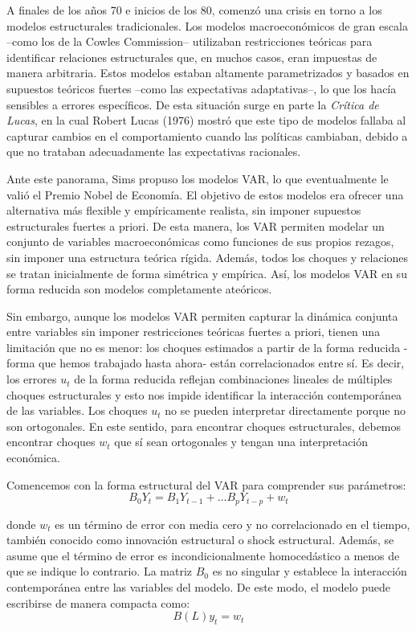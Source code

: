 \documentclass[
]{book}
\begin{document}
A finales de los años 70 e inicios de los 80, comenzó una crisis en
torno a los modelos estructurales tradicionales. Los modelos
macroeconómicos de gran escala --como los de la Cowles Commission--
utilizaban restricciones teóricas para identificar relaciones
estructurales que, en muchos casos, eran impuestas de manera arbitraria.
Estos modelos estaban altamente parametrizados y basados en supuestos
teóricos fuertes --como las expectativas adaptativas--, lo que los hacía
sensibles a errores específicos. De esta situación surge en parte la
\emph{Crítica de Lucas}, en la cual Robert Lucas (1976) mostró que este tipo
de modelos fallaba al capturar cambios en el comportamiento cuando las
políticas cambiaban, debido a que no trataban adecuadamente las
expectativas racionales.

Ante este panorama, Sims propuso los modelos VAR, lo que eventualmente
le valió el Premio Nobel de Economía. El objetivo de estos modelos era
ofrecer una alternativa más flexible y empíricamente realista, sin
imponer supuestos estructurales fuertes a priori. De esta manera, los
VAR permiten modelar un conjunto de variables macroeconómicas como
funciones de sus propios rezagos, sin imponer una estructura teórica
rígida. Además, todos los choques y relaciones se tratan inicialmente de
forma simétrica y empírica. Así, los modelos VAR en su forma reducida
son modelos completamente ateóricos.

Sin embargo, aunque los modelos VAR permiten capturar la dinámica
conjunta entre variables sin imponer restricciones teóricas fuertes a
priori, tienen una limitación que no es menor: los choques estimados a
partir de la forma reducida -forma que hemos trabajado hasta
ahora- están correlacionados entre sí. Es decir, los errores \(u_t\)
de la forma reducida reflejan combinaciones lineales de múltiples
choques estructurales y esto nos impide identificar la interacción contemporánea de las variables. Los choques \(u_t\) no se pueden interpretar directamente porque no son ortogonales. En este sentido, para encontrar choques estructurales, debemos encontrar choques \(w_t\) que sí sean ortogonales y tengan una interpretación económica.

Comencemos con la forma estructural del VAR para comprender sus parámetros:
\begin{equation}
B_0 Y_t = B_1 Y_{t-1} + ... B_p Y_{t-p} + w_t
\end{equation}

donde \(w_t\) es un término de error con media cero y no correlacionado en el tiempo, también conocido como innovación estructural o shock estructural. Además, se asume que el término de error es incondicionalmente homocedástico a menos de que se indique lo contrario. La matriz \(B_0\) es no singular y establece la interacción contemporánea entre las variables del modelo. De este modo, el modelo puede escribirse de manera compacta como:
\begin{equation}
B(L) y_t = w_t
\end{equation}
\end{document}

